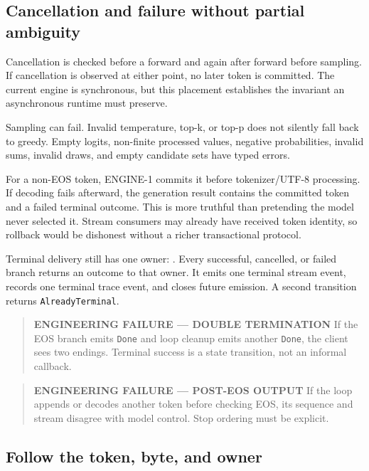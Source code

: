 \documentclass[
  10pt,
]{article}
\begin{document}
\subsection{Cancellation and failure without partial
ambiguity}\label{cancellation-and-failure-without-partial-ambiguity}

Cancellation is checked before a forward and again after forward before
sampling. If cancellation is observed at either point, no later token is
committed. The current engine is synchronous, but this placement
establishes the invariant an asynchronous runtime must preserve.

Sampling can fail. Invalid temperature, top-k, or top-p does not
silently fall back to greedy. Empty logits, non-finite processed values,
negative probabilities, invalid sums, invalid draws, and empty candidate
sets have typed errors.

For a non-EOS token, ENGINE-1 commits it before tokenizer/UTF-8
processing. If decoding fails afterward, the generation result contains
the committed token and a failed terminal outcome. This is more truthful
than pretending the model never selected it. Stream consumers may
already have received token identity, so rollback would be dishonest
without a richer transactional protocol.

Terminal delivery still has one owner:
\texttt{}. Every successful, cancelled, or
failed branch returns an outcome to that owner. It emits one terminal
stream event, records one terminal trace event, and closes future
emission. A second transition returns \texttt{AlreadyTerminal}.

\begin{quote}
\textbf{ENGINEERING FAILURE --- DOUBLE TERMINATION} If the EOS branch
emits \texttt{Done} and loop cleanup emits another \texttt{Done}, the
client sees two endings. Terminal success is a state transition, not an
informal callback.
\end{quote}

\begin{quote}
\textbf{ENGINEERING FAILURE --- POST-EOS OUTPUT} If the loop appends or
decodes another token before checking EOS, its sequence and stream
disagree with model control. Stop ordering must be explicit.
\end{quote}

\subsection{Follow the token, byte, and
owner}\label{follow-the-token-byte-and-owner-1}
\end{document}

